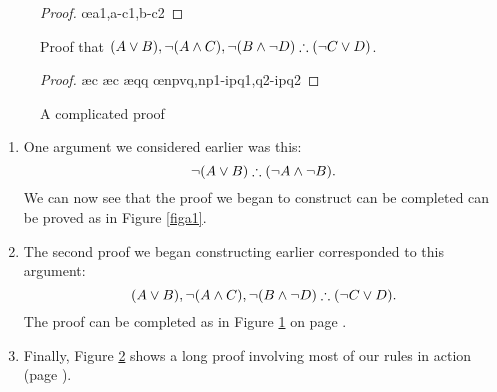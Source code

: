 \begin{figure}
	\begin{proof}
	\open{}
	\open{}
\open {}
\open {}
\close
{}
\close
\open {}
\open{}
\close
{}
\close
	\oe{a1,a-c1,b-c2}
\end{proof}
\caption{Proof that $(A\vee B), \neg (A\wedge C), \neg (B \wedge \neg D) \mathrel{\therefore} (\neg C\vee D)$.\label{figa2}}
\end{figure}

 \begin{figure}
	\begin{proof}
	\open
		\open
			\open
				\open
				\ae{c}
				\ae{c}
				\close
			\close
		\close
		\open
			\open
			\ae{qq}
			\close
		\close
		\oe{npvq,np1-ipq1,q2-ipq2}
		\close
		\open
			\open
				\open
				\close
			\close
		\close
\end{proof}\caption{A complicated proof\label{fig:vi}}
\end{figure}

\begin{enumerate}
	\item One argument we considered earlier was this: $$\neg (A \vee B) \mathrel{\therefore} (\neg A \wedge \neg B).$$ We can now see that the proof we began to construct can be completed can be proved as in Figure \ref{figa1}.
	\item The second proof we began constructing earlier corresponded to this argument: $$(A\vee B), \neg (A\wedge C), \neg (B \wedge \neg D) \mathrel{\therefore} (\neg C\vee D).$$ The proof can be completed as in Figure \ref{figa2} on page \pageref{figa2}.
	\item Finally, Figure \ref{fig:vi} shows a long proof involving most of our rules in action (page \pageref{fig:vi}). 
\end{enumerate}

